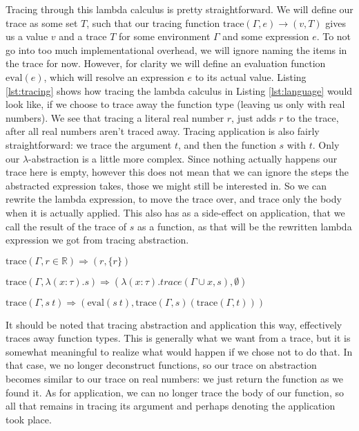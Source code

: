         Tracing through this lambda calculus is pretty straightforward.
        We will define our trace as some set $T$, such that our tracing function $\text{trace}(\Gamma,e)\to(v,T)$ gives us a value $v$ and a trace $T$ for some environment $\Gamma$ and some expression $e$.
        To not go into too much implementational overhead, we will ignore naming the items in the trace for now.
        However, for clarity we will define an evaluation function $\text{eval}(e)$, which will resolve an expression $e$ to its actual value.
        Listing \ref{lst:tracing} shows how tracing the lambda calculus in Listing \ref{lst:language} would look like, if we choose to trace away the function type (leaving us only with real numbers).
        We see that tracing a literal real number $r$, just adds $r$ to the trace, after all real numbers aren't traced away.
        Tracing application is also fairly straightforward: we trace the argument $t$, and then the function $s$ with $t$.
        Only our $\lambda$-abstraction is a little more complex.
        Since nothing actually happens our trace here is empty, however this does not mean that we can ignore the steps the abstracted expression takes, those we might still be interested in.
        So we can rewrite the lambda expression, to move the trace over, and trace only the body when it is actually applied.
        This also has as a side-effect on application, that we call the result of the trace of $s$ as a function, as that will be the rewritten lambda expression we got from tracing abstraction.

        \begin{quicklst}[caption=First tracing rules, label=lst:tracing, gobble=12]
            $\text{trace}(\Gamma,r\in\mathbb{R})\Rightarrow(r, \{r\})$

            $\text{trace}(\Gamma,\lambda(x:\tau).s)\Rightarrow(\lambda(x:\tau).trace(\Gamma\cup x, s),\emptyset)$

            $\text{trace}(\Gamma,s\ t)\Rightarrow(\text{eval}(s\ t),\text{trace}(\Gamma, s)(\text{trace}(\Gamma,t)))$
        \end{quicklst}

        It should be noted that tracing abstraction and application this way, effectively traces away function types.
        This is generally what we want from a trace, but it is somewhat meaningful to realize what would happen if we chose not to do that.
        In that case, we no longer deconstruct functions, so our trace on abstraction becomes similar to our trace on real numbers: we just return the function as we found it.
        As for application, we can no longer trace the body of our function, so all that remains in tracing its argument and perhaps denoting the application took place.

